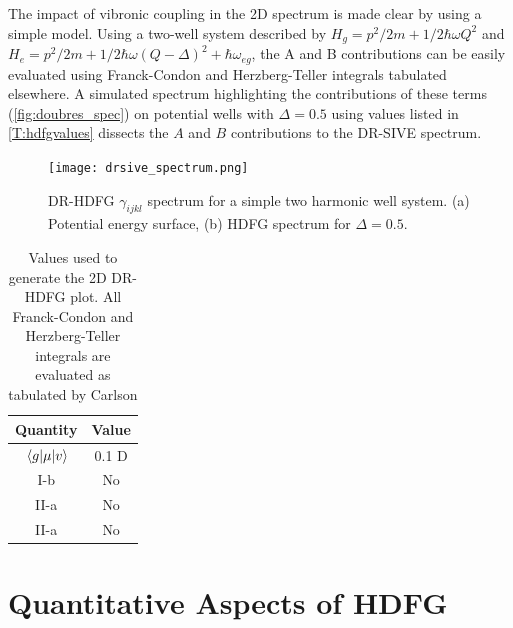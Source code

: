 \documentclass[aip, jcp, reprint, onecolumn]{revtex4-2}
\begin{document}
The impact of vibronic coupling in the 2D spectrum is made clear by using a simple model.
Using a two-well system described by $H_g = p^2/2m + 1/2 \hbar \omega Q^2$ and $H_e = p^2/2m + 1/2 \hbar \omega (Q-\Delta)^2 +\hbar \omega_{eg}$, the A and B contributions can be easily evaluated using Franck-Condon and Herzberg-Teller integrals tabulated elsewhere. \cite{Carlson1988thesis} 
A simulated spectrum highlighting the contributions of these terms (\autoref{fig:doubres_spec}) on potential wells with $\Delta = 0.5$ using values listed in \autoref{T:hdfgvalues} dissects the $A$ and $B$ contributions to the DR-SIVE spectrum.

\begin{figure}[!htbp]
	\centering
	\texttt{[image: drsive\_spectrum.png]}
	\caption{DR-HDFG $\gamma_{ijkl}$ spectrum for a simple two harmonic well system.
		(a) Potential energy surface, (b) HDFG spectrum for $\Delta = 0.5$.}
	\label{fig:doubres_spec}
\end{figure}

\begin{table}[!htbp]
	\caption{\label{T:hdfgvalues} Values used to generate the 2D DR-HDFG plot. 
	All Franck-Condon and Herzberg-Teller integrals are evaluated as tabulated by Carlson \cite{Carlson1988thesis}}
	\begin{ruledtabular}
		\begin{tabular}{cc}
			Quantity & Value\\
			\hline  
			$\mel{g}{\mu}{v}$ & 0.1 D\\
			I-b & No\\
			II-a & No\\
			II-a & No\\
		\end{tabular}
	\end{ruledtabular}
\end{table}

\section{Quantitative Aspects of HDFG}\label{quant}
\end{document}
